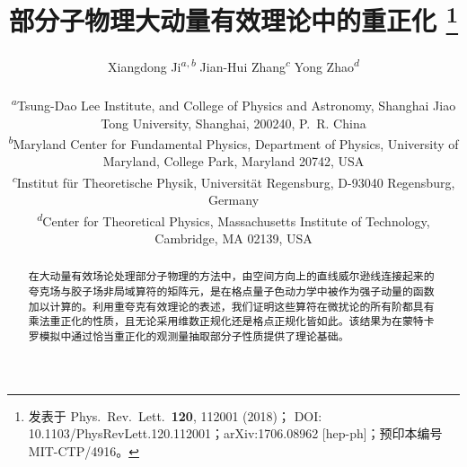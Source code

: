 \documentclass[11pt]{ctexart}
\title{部分子物理大动量有效理论中的重正化%
\thanks{发表于 Phys.\ Rev.\ Lett.\ \textbf{120}, 112001 (2018)；
DOI: 10.1103/PhysRevLett.120.112001；arXiv:1706.08962 [hep-ph]；预印本编号 MIT-CTP/4916。}}
\author{Xiangdong Ji\textsuperscript{$a,b$}\quad
        Jian-Hui Zhang\textsuperscript{$c$}\quad
        Yong Zhao\textsuperscript{$d$}\\[8pt]
\normalsize
\begin{minipage}{0.95\textwidth}\raggedright\footnotesize
\textsuperscript{$a$}Tsung-Dao Lee Institute, and College of Physics and Astronomy, Shanghai Jiao Tong University, Shanghai, 200240, P.~R. China\\
\textsuperscript{$b$}Maryland Center for Fundamental Physics, Department of Physics, University of Maryland, College Park, Maryland 20742, USA\\
\textsuperscript{$c$}Institut f\"ur Theoretische Physik, Universit\"at Regensburg, D-93040 Regensburg, Germany\\
\textsuperscript{$d$}Center for Theoretical Physics, Massachusetts Institute of Technology, Cambridge, MA 02139, USA
\end{minipage}}
\date{}
\begin{document}
\maketitle

\begin{abstract}
在大动量有效场论处理部分子物理的方法中，由空间方向上的直线威尔逊线连接起来的夸克场与胶子场非局域算符的矩阵元，是在格点量子色动力学中被作为强子动量的函数加以计算的。利用重夸克有效理论的表述，我们证明这些算符在微扰论的所有阶都具有乘法重正化的性质，且无论采用维数正规化还是格点正规化皆如此。该结果为在蒙特卡罗模拟中通过恰当重正化的观测量抽取部分子性质提供了理论基础。
\end{abstract}








\end{document}
